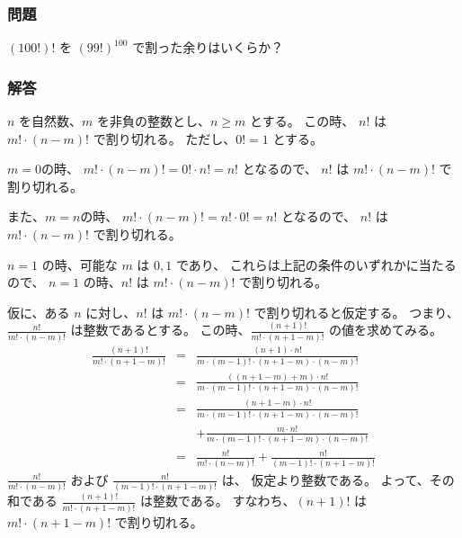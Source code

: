 \subsubsection{問題}
\label{sssec:階乗:階乗の階乗を割った余り:問題}

$(100 !)!$ を $(99!)^{100}$ で割った余りはいくらか？


\clearpage
\subsubsection{解答}
\label{sssec:階乗:階乗の階乗を割った余り:解答}

\begin{Lemma}
  $n$ を自然数、$m$ を非負の整数とし、$n \ge m$ とする。
  この時、
  $n!$ は $m! \cdot (n-m)!$ で割り切れる。
  ただし、$0! = 1$ とする。
\end{Lemma}
\begin{Proof}
    $m=0$の時、
    $m! \cdot (n-m)! = 0! \cdot n! = n!$ となるので、
    $n!$ は $m! \cdot (n-m)!$ で割り切れる。

    また、$m=n$の時、
    $m! \cdot (n-m)! = n! \cdot 0! = n!$ となるので、
    $n!$ は $m! \cdot (n-m)!$ で割り切れる。

    $n=1$ の時、可能な $m$ は $0,1$ であり、
    これらは上記の条件のいずれかに当たるので、
    $n=1$ の時、$n!$ は $m! \cdot (n-m)!$ で割り切れる。

    仮に、ある $n$ に対し、$n!$ は $m! \cdot (n-m)!$ で割り切れると仮定する。
    つまり、$\frac{n!}{m! \cdot (n-m)!}$ は整数であるとする。
    この時、$\frac{(n+1)!}{m! \cdot (n+1-m)!}$ の値を求めてみる。
      \begin{eqnarray}
          \frac{(n+1)!}{m! \cdot (n+1-m)!}
            & = &
              \frac{(n+1) \cdot n!}{m \cdot (m-1)! \cdot (n+1-m) \cdot (n-m)!}
          \\
            & = &
              \frac{((n+1-m)+m) \cdot n!}{m \cdot (m-1)! \cdot (n+1-m) \cdot (n-m)!}
          \\
            & = &
              \frac{(n+1-m) \cdot n!}{m \cdot (m-1)! \cdot (n+1-m) \cdot (n-m)!}
          \nonumber \\ & &
            + \frac{m \cdot n!}{m \cdot (m-1)! \cdot (n+1-m) \cdot (n-m)!}
          \\
            & = &
              \frac{n!}{m! \cdot (n-m)!}
            + \frac{n!}{(m-1)! \cdot (n+1-m)!}
      \end{eqnarray}
    $\frac{n!}{m! \cdot (n-m)!}$ および $\frac{n!}{(m-1)! \cdot (n+1-m)!}$ は、
    仮定より整数である。
    よって、その和である $\frac{(n+1)!}{m! \cdot (n+1-m)!}$ は整数である。
    すなわち、$(n+1)!$ は $m! \cdot (n+1-m)!$ で割り切れる。
\end{Proof}

